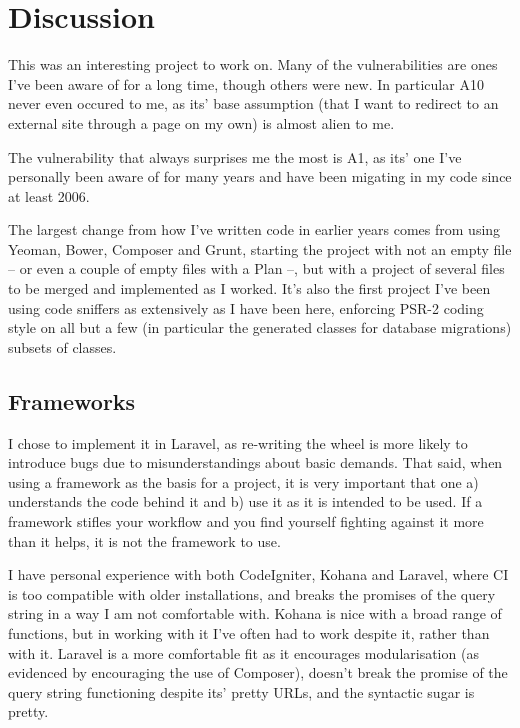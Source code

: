 \chapter{Discussion}
\label{ch:discussion}
\noindent
This was an interesting project to work on. Many of the vulnerabilities are ones I've been aware of for a long time, though others were new. In particular A10 never even occured to me, as its' base assumption (that I want to redirect to an external site through a page on my own) is almost alien to me.

The vulnerability that always surprises me the most is A1, as its' one I've personally been aware of for many years and have been migating in my code since at least 2006.

The largest change from how I've written code in earlier years comes from using Yeoman, Bower, Composer and Grunt, starting the project with not an empty file -- or even a couple of empty files with a Plan --, but with a project of several files to be merged and implemented as I worked. It's also the first project I've been using code sniffers as extensively as I have been here, enforcing PSR-2 coding style on all but a few (in particular the generated classes for database migrations) subsets of classes.

\section{Frameworks}
\label{ch:frameworks}
\noindent
I chose to implement it in Laravel, as re-writing the wheel is more likely to introduce bugs due to misunderstandings about basic demands. That said, when using a framework as the basis for a project, it is very important that one a) understands the code behind it and b) use it as it is intended to be used. If a framework stifles your workflow and you find yourself fighting against it more than it helps, it is not the framework to use.

I have personal experience with both CodeIgniter, Kohana and Laravel, where CI is too compatible with older installations, and breaks the promises of the query string in a way I am not comfortable with. Kohana is nice with a broad range of functions, but in working with it I've often had to work despite it, rather than with it. Laravel is a more comfortable fit as it encourages modularisation (as evidenced by encouraging the use of Composer), doesn't break the promise of the query string functioning despite its' pretty URLs, and the syntactic sugar is pretty.

